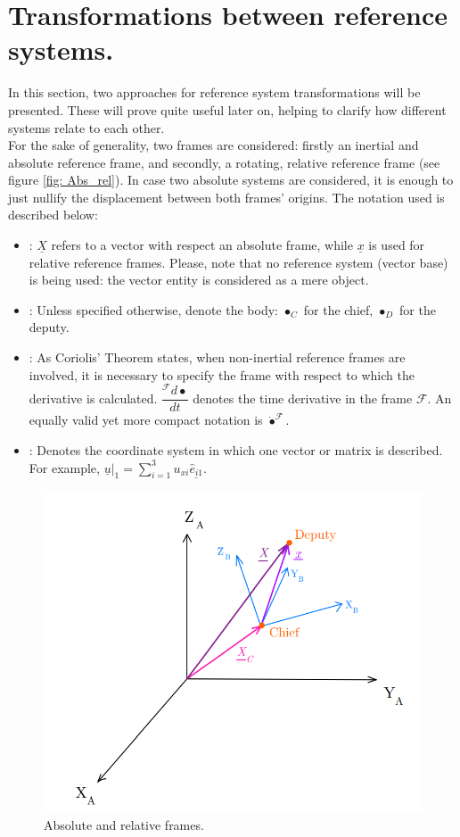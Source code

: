 \section{Transformations between reference systems.}
%
\indent In this section, two approaches for reference system transformations will be presented. These will prove quite useful later on, helping to clarify how different systems relate to each other. \\
%
\indent For the sake of generality, two frames are considered: firstly an inertial and absolute reference frame, and secondly, a rotating, relative reference frame (see figure \ref{fig:	Abs_rel}). In case two absolute systems are considered, it is enough to just nullify the displacement between both frames' origins. The notation used is described below:
%
\begin{itemize}
%
\item[\GMVred{$\bullet$}] : $\underline{X}$ refers to a vector with respect an absolute frame, while $\underline{x}$ is used for relative reference frames. Please, note that no reference system (\ie vector base) is being used: the vector entity is considered as a mere object.
%
\item[\GMVred{$\bullet$}] : Unless specified otherwise, denote the body: $\bullet_{C}$ for the chief, $\bullet_D$ for the deputy.
%
\item[\GMVred{$\bullet$}] : As Coriolis' Theorem states, when non-inertial reference frames are involved, it is necessary to specify the frame with respect to which the derivative is calculated. $\dfrac{^{\mathcal{F}} d \bullet}{dt}$ denotes the time derivative in the frame $\mathcal{F}$. An equally valid yet more compact notation is $\dot{\bullet}^{\mathcal{F}}$. 
%
\item[\GMVred{$\bullet$}] : Denotes the coordinate system in which one vector or matrix is described. For example, $\underline{u}\rvert_{1} = \sum_{i=1}^3 u_{xi} \underline{\hat{e}_{i1}} $.
%
\end{itemize}
%
%
\begin{figure}[!htb]
\centering\includegraphics[width = 0.7\linewidth]{Appendices/Appendix_B/Abs_rel}
\caption{Absolute and relative frames.}
\label{fig:	Abs_rel}
\end{figure}
